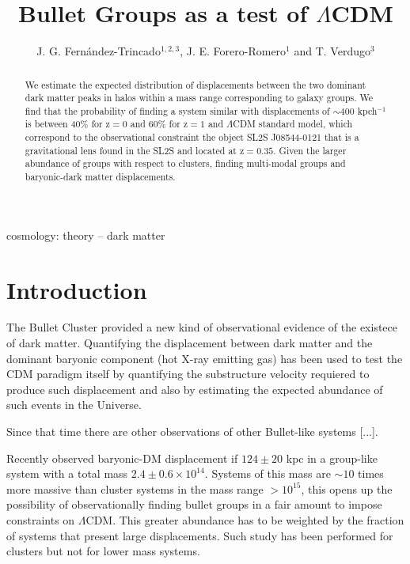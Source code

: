 \documentclass{emulateapj}
\newcommand{\hMsun}{{\ifmmode{h^{-1}{\rm {M_{\odot}}}}\else{$h^{-1}{\rm{M_{\odot}}}$}\fi}}
\newcommand{\Msun}{{\ifmmode{{\rm {M_{\odot}}}}\else{${\rm{M_{\odot}}}$}\fi}}
\begin{document}
 

\title{Bullet Groups as a test of $\Lambda$CDM}
\author{J. G. Fern\'andez-Trincado$^{1,2,3}$, J. E. Forero-Romero$^1$
  and T. Verdugo$^3$} 

\begin{abstract}

We estimate the expected distribution of displacements between the two
dominant dark matter peaks in halos within a mass range corresponding
to galaxy groups. We find that the probability of finding a system
similar with displacements of $\sim$400 kpch$^{-1}$ is between 40\%
for z$=0$ and 60\% for z$=1$ and $\Lambda$CDM standard model, which
correspond to the observational constraint the object SL2S J08544-0121
that is  a gravitational lens found in the SL2S and located at
z$=0.35$. Given the larger abundance of groups with respect to
clusters, finding multi-modal groups and baryonic-dark matter
displacements.  
\end{abstract}

\begin{keywords}
{cosmology: theory -- dark matter} 
\end{keywords}

\section{Introduction}


The Bullet Cluster provided a new kind of observational evidence of
the existece of dark matter. Quantifying the displacement between dark
matter and the dominant baryonic component (hot X-ray emitting gas)
has been used to test the CDM paradigm itself by quantifying the
substructure velocity requiered to produce such displacement and also
by estimating the expected abundance of such events in the Universe.

Since that time there are other observations of other Bullet-like
systems [...].

Recently \citep{Gastaldello} observed baryonic-DM displacement if
$124\pm 20$ kpc in a group-like system with a total mass $2.4\pm 0.6
\times 10^{14}$\Msun. Systems of this mass are $\sim 10$ times more massive
than cluster systems in the mass range $>10^{15}$\hMsun, this opens
up the possibility of observationally finding bullet groups in a fair
amount to impose constraints on $\Lambda$CDM. This greater abundance
has to be weighted by the fraction of systems that present large
displacements. Such study has been performed for clusters but not for
lower mass systems.
\end{document}
